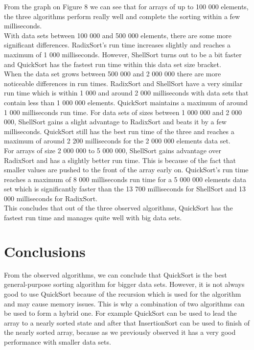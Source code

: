 \documentclass{acm_proc_article-sp}
\begin{document}
From the graph on Figure 8 we can see that for arrays of up to 100 000 elements, the three algorithms perform really well and complete the sorting within a few milliseconds.\\
With data sets between 100 000 and 500 000 elements, there are some more significant differences. RadixSort's run time increases slightly and reaches a maximum of 1 000 milliseconds. However, ShellSort turns out to be a bit faster and QuickSort has the fastest run time within this data set size bracket.\\
When the data set grows between 500 000 and 2 000 000 there are more noticeable differences in run times. RadixSort and ShellSort have a very similar run time which is within 1 000 and around 2 000 milliseconds with data sets that contain less than 1 000 000 elements. QuickSort maintains a maximum of around 1 000 milliseconds run time. For data sets of sizes between 1 000 000 and 2 000 000, ShellSort gains a slight advantage to RadixSort and beats it by a few milliseconds. QuickSort still has the best run time of the three and reaches a maximum of around 2 200 milliseconds for the 2 000 000 elements data set.\\
For arrays of size 2 000 000 to 5 000 000, ShellSort gains advantage over RadixSort and has a slightly better run time. This is because of the fact that smaller values are pushed to the front of the array early on. QuickSort's run time reaches a maximum of 8 000 milliseconds run time for a 5 000 000 elements data set which is significantly faster than the 13 700 milliseconds for ShellSort and 13 000 milliseconds for RadixSort.\\
This concludes that out of the three observed algorithms, QuickSort has the fastest run time and manages quite well with big data sets.

\section{Conclusions}
From the observed algorithms, we can conclude that QuickSort is the best general-purpose sorting algorithm for bigger data sets. However, it is not always good to use QuickSort because of the recursion which is used for the algorithm and may cause memory issues. This is why a combination of two algorithms can be used to form a hybrid one. For example QuickSort can be used to lead the array to a nearly sorted state and after that InsertionSort can be used to finish of the nearly sorted array, because as we previously observed it has a very good performance with smaller data sets.
\end{document}
